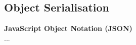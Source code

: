 \documentclass[../report.tex]{subfiles}
\begin{document}


\subsection{Object Serialisation} %










\textbf{JavaScript Object Notation (JSON)} \\

...
\end{document}

